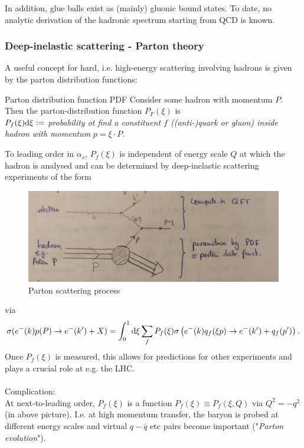 In addition, glue balls exist as (mainly) gluonic bound states. To date, no analytic derivation of the hadronic spectrum starting from QCD is known.
\newpage
\subsubsection{Deep-inelastic scattering - Parton theory}
A useful concept for hard, i.e. high-energy scattering involving hadrons is given by the parton distribution functions:
\begin{mybox}{Parton distribution function PDF}
	Consider some hadron with momentum $P$. Then the parton-distribution function $P_F(\xi)$ is \\
	$P_f(\xi)\mathrm{d} \xi:=$ \emph{probability ot find a constituent $f$ ((anti-)quark or gluon) inside hadron with momentum} $p=\xi \cdot P$.
\end{mybox}
To leading order in $\alpha_s$, $P_f(\xi)$ is independent of energy scale $Q$ at which the hadron is analysed and can be determined by deep-inelastic scattering experiments of the form 

\begin{figure}[h!]
	\centering
	\includegraphics[width=0.7\linewidth]{gfx/YMpictures/PartonScattering}
	\caption{Parton scattering process}
	\label{fig:partonscattering}
\end{figure}










via
\begin{equation}
	\sigma(e^-(k)p(P) \rightarrow e^-(k^\prime)+X) = \int_0^1 \mathrm{d} \xi \sum_f P_f(\xi) \sigma\left(e^-(k) q_f( \xi p) \rightarrow e^-(k^\prime) +q_f(p^\prime)\right).
\end{equation}
Once $P_f(\xi)$ is measured, this allows for predictions for other experiments and plays a crucial role at e.g. the LHC.\\
\\
Complication:\\
At next-to-leading order, $P_f(\xi)$ is a function $P_f(\xi)\equiv P_f(\xi,Q)$ via $Q^2=-q^2$ (in above picture). I.e. at high momentum transfer, the baryon is probed at different energy scales and virtual $q-\bar{q}$ etc pairs become important ("\emph{Parton evolution}").






